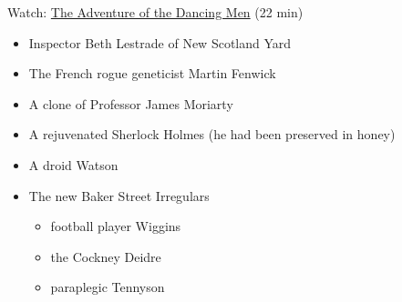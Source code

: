 \documentclass[a4paper,landscape,headrule,footrule,xetex]{foils}
\begin{document}
Watch: \href{https://www.youtube.com/watch?v=d9Eiy5FvYO0}{The Adventure of
  the Dancing Men} (22 min)


\begin{itemize}
\item Inspector Beth Lestrade of New Scotland Yard 
\item The French rogue geneticist Martin Fenwick
\item A clone of Professor James Moriarty
\item A rejuvenated Sherlock Holmes (he had been preserved in honey)
\item A   droid Watson
\item The new Baker Street Irregulars
  \begin{itemize}
  \item football player Wiggins
  \item the Cockney Deidre
  \item paraplegic Tennyson
  \end{itemize}
\end{itemize}
\end{document}
